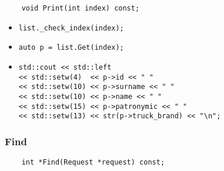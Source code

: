 \begin{lstlisting}
    void Print(int index) const;
\end{lstlisting}

\begin{itemize}
    \item \verb|list._check_index(index);|
    \item \verb|auto p = list.Get(index);|
    \item \verb|std::cout << std::left|\\
          \verb|<< std::setw(4)  << p->id << " "|\\
          \verb|<< std::setw(10) << p->surname << " "|\\
          \verb|<< std::setw(10) << p->name << " "|\\
          \verb|<< std::setw(15) << p->patronymic << " "|\\
          \verb|<< std::setw(13) << str(p->truck_brand) << "\n";|
\end{itemize}

\subsubsection{Find}

\begin{lstlisting}
    int *Find(Request *request) const;
\end{lstlisting}

